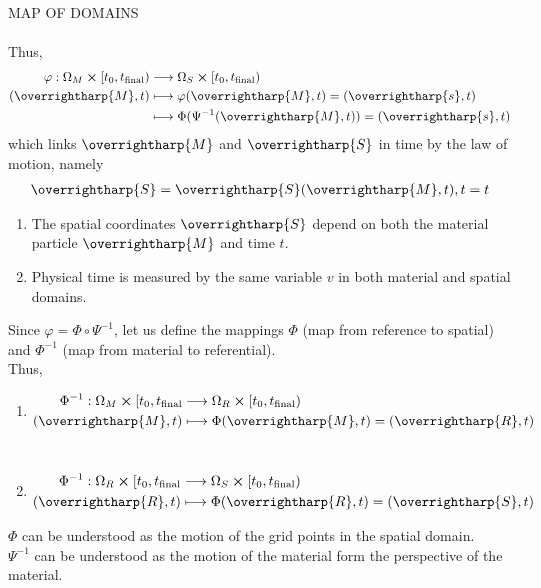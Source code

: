 \documentclass[12pt, a4paper, fleqn]{article}
\theoremstyle{definition}
\theoremstyle{remark}
\theoremstyle{definition}
\newcommand*{\vtr}[1]{\text{\overrightharp{\ensuremath{#1}}}}
\newcommand{\?}{\stackrel{?}{=}}
\begin{document}
MAP OF DOMAINS \\ \\

\noindent Thus,
\begin{align*}
\varphi : {\Omega}_{M} \cross [{t}_{0}, {t}_{\text{final}}) &\longrightarrow {\Omega}_{S} \cross [{t}_{0}, {t}_{\text{final}})\\
( \vtr{M}, t) &\longmapsto \varphi( \vtr{M}, t) = ( \vtr{s}, t)\\
& \longmapsto \Phi({\Psi}^{-1}( \vtr{M}, t)) = ( \vtr{s}, t)
\end{align*}
which links $\vtr{M}$ and $ \vtr{S}$ in time by the law of motion, namely
\begin{align}
\vtr{S} = \vtr{S}(\vtr{M}, t), t = t
\end{align}

\begin{enumerate}
\item The spatial coordinates $\vtr{S}$ depend on both the material particle $\vtr{M}$ and time $t$.\\
\item Physical time is measured by the same variable $v$ in both material and spatial domains. \\
\end{enumerate}

\noindent Since $\varphi = \Phi \circ {\Psi}^{-1}$, let us define the mappings $\Phi$ (map from reference to spatial) and ${\Phi}^{-1}$ (map from material to referential).\\

\noindent Thus,
\begin{enumerate}
\item
\begin{align*}
{\Phi}^{-1} : {\Omega}_{M} \cross [{t}_{0}, {t}_{\text{final}} &\longrightarrow {\Omega}_{R} \cross [{t}_{0}, {t}_{\text{final}})\\
(\vtr{M}, t) &\longmapsto \Phi(\vtr{M}, t) = (\vtr{R}, t) \\
\end{align*}\\
\item
\begin{align*}
{\Phi}^{-1} : {\Omega}_{R} \cross [{t}_{0}, {t}_{\text{final}} &\longrightarrow {\Omega}_{S} \cross [{t}_{0}, {t}_{\text{final}})\\
(\vtr{R}, t) &\longmapsto \Phi(\vtr{R}, t) = (\vtr{S}, t)
\end{align*}
\end{enumerate}
$\Phi$ can be understood as the motion of the grid points in the spatial domain. \\
${\Psi}^{-1}$ can be understood as the motion of the material form the perspective of the material. \\
\end{document}
